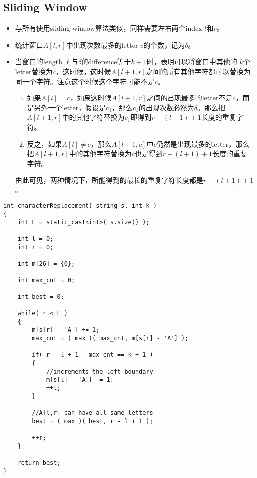 \subsection{Sliding Window}
\begin{itemize}
\item 与所有使用sliding window算法类似，同样需要左右两个index $l$和$r$。
\item 统计窗口$A[l,r]$中出现次数最多的letter $c$的个数，记为$\delta$。
\item 当窗口的length $\ell$与$\delta$的difference等于$k+1$时，表明可以将窗口中其他的 $k$个letter替换为$c$，这时候，这时候$A[l+1, r]$之间的所有其他字符都可以替换为同一个字符。注意这个时候这个字符可能不是$c$。
\begin{enumerate}
\item 如果$A[l]=c$，如果这时候$A[l+1,r]$之间的出现最多的letter不是$c$，而是另外一个letter，假设是$c_1$，那么$c_1$的出现次数必然为$\delta$。那么把$A[l+1,r]$中的其他字符替换为$c_1$即得到$r-(l+1)+1$长度的重复字符。
\item 反之，如果$A[l]\neq c$，那么$A[l+1,c]$中$c$仍然是出现最多的letter，那么把$A[l+1,r]$中的其他字符替换为$c$也是得到$r-(l+1)+1$长度的重复字符。
\end{enumerate}
由此可见，两种情况下，所能得到的最长的重复字符长度都是$r-(l+1)+1$。
\end{itemize}

\setcounter{lstlisting}{0}
\begin{lstlisting}[style=customc, caption={Sliding Window}]
int characterReplacement( string s, int k )
{
    int L = static_cast<int>( s.size() );

    int l = 0;
    int r = 0;

    int m[26] = {0};

    int max_cnt = 0;

    int best = 0;

    while( r < L )
    {
        m[s[r] - 'A'] += 1;
        max_cnt = ( max )( max_cnt, m[s[r] - 'A'] );

        if( r - l + 1 - max_cnt == k + 1 )
        {
            //increments the left boundary
            m[s[l] - 'A'] -= 1;
            ++l;
        }

        //A[l,r] can have all same letters
        best = ( max )( best, r - l + 1 );

        ++r;
    }

    return best;
}
\end{lstlisting}
